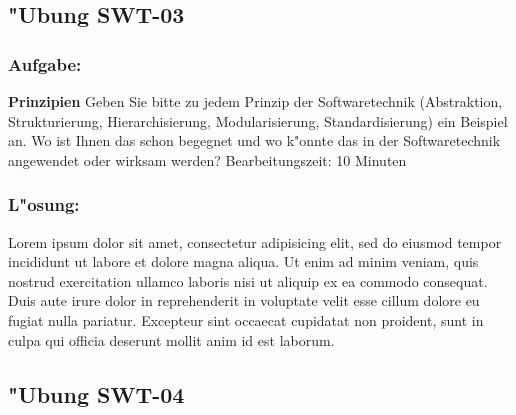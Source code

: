 





\newpage
\subsection{"Ubung SWT-03}
\subsubsection*{Aufgabe:}

\begin{framed}
\textbf{Prinzipien}
\smallbreak
Geben Sie bitte zu jedem Prinzip der Softwaretechnik (Abstraktion, Strukturierung, Hierarchisierung, Modularisierung, Standardisierung) ein Beispiel an. Wo ist Ihnen das schon begegnet und wo k"onnte das in der Softwaretechnik angewendet oder wirksam werden?
\bigbreak
\small Bearbeitungszeit: 10 Minuten
\end{framed}
\bigbreak
\bigbreak
\subsubsection*{L"osung:}
Lorem ipsum dolor sit amet, consectetur adipisicing elit, sed do eiusmod tempor incididunt ut labore et dolore magna aliqua. Ut enim ad minim veniam, quis nostrud exercitation ullamco laboris nisi ut aliquip ex ea commodo consequat. Duis aute irure dolor in reprehenderit in voluptate velit esse cillum dolore eu fugiat nulla pariatur. Excepteur sint occaecat cupidatat non proident, sunt in culpa qui officia deserunt mollit anim id est laborum.

\newpage
\subsection{"Ubung SWT-04}
